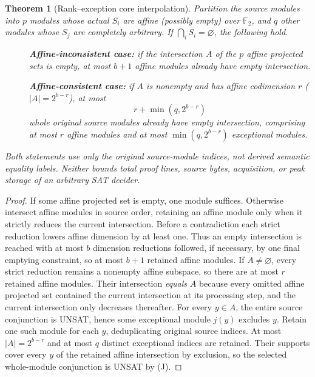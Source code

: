 \documentclass[11pt]{article}
\newtheorem{theorem}{Theorem}
\newcommand{\Ftwo}{\mathbb F_2}
\begin{document}
\begin{theorem}[Rank--exception core interpolation]\label{th:interpolate}
Partition the source modules into $p$ modules whose actual $S_i$ are affine (possibly empty) over $\Ftwo$, and $q$ other modules whose $S_j$ are completely arbitrary. If $\bigcap_i S_i=\varnothing$, the following hold.
\begin{description}
\item[] \textbf{Affine-inconsistent case:} if the intersection $A$ of the $p$ affine projected sets is empty, at most $b+1$ \emph{affine} modules already have empty intersection.
\item[] \textbf{Affine-consistent case:} if $A$ is nonempty and has affine codimension $r$ ($|A|=2^{b-r}$), at most
\[
\boxed{r+\min(q,2^{b-r})}
\]
\emph{whole original source modules} already have empty intersection, comprising at most $r$ affine modules and at most $\min(q,2^{b-r})$ exceptional modules.
\end{description}
Both statements use only the original source-module indices, not derived semantic equality labels. Neither bounds total proof lines, source bytes, acquisition, or peak storage of an arbitrary SAT decider.
\end{theorem}
\begin{proof}
If some affine projected set is empty, one module suffices. Otherwise intersect affine modules in source order, retaining an affine module only when it strictly reduces the current intersection. Before a contradiction each strict reduction lowers affine dimension by at least one. Thus an empty intersection is reached with at most $b$ dimension reductions followed, if necessary, by one final emptying constraint, so at most $b+1$ retained affine modules.
If $A\ne\varnothing$, every strict reduction remains a nonempty affine subspace, so there are at most $r$ retained affine modules. Their intersection \emph{equals} $A$ because every omitted affine projected set contained the current intersection at its processing step, and the current intersection only decreases thereafter. For every $y\in A$, the entire source conjunction is UNSAT, hence some exceptional module $j(y)$ excludes $y$. Retain one such module for each $y$, deduplicating original source indices. At most $|A|=2^{b-r}$ and at most $q$ distinct exceptional indices are retained. Their supports cover every $y$ of the retained affine intersection by exclusion, so the selected whole-module conjunction is UNSAT by (J).
\end{proof}
\end{document}
